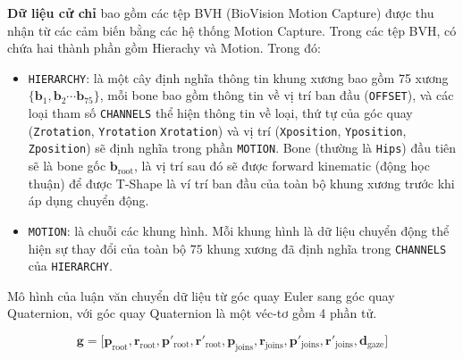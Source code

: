 \textbf{Dữ liệu cử chỉ} bao gồm các tệp BVH (BioVision Motion Capture) được thu nhận từ các cảm biến bằng các hệ thống Motion Capture. Trong các tệp BVH, có chứa hai thành phần gồm Hierachy và Motion. Trong đó:

\begin{itemize}
	\item \texttt{HIERARCHY}: là một cây định nghĩa thông tin khung xương bao gồm 75 xương $\{ \mathbf{b}_1, \mathbf{b}_2 \cdots \mathbf{b}_{75} \} $, mỗi bone bao gồm thông tin về vị trí ban đầu (\texttt{OFFSET}), và các loại tham số \texttt{CHANNELS} thể hiện thông tin về loại, thứ tự của góc quay (\texttt{Zrotation}, \texttt{Yrotation} \texttt{Xrotation}) và vị trí (\texttt{Xposition}, \texttt{Yposition}, \texttt{Zposition}) sẽ định nghĩa trong phần \texttt{MOTION}. Bone (thường là \texttt{Hips}) đầu tiên sẽ là bone gốc $\mathbf{b}_{\text{root}}$, là vị trí sau đó sẽ được forward kinematic (động học thuận) để được T-Shape là ví trí ban đầu của toàn bộ khung xương trước khi áp dụng chuyển động.
	
	\item \texttt{MOTION}: là chuỗi các khung hình. Mỗi khung hình là dữ liệu chuyển động thể hiện sự thay đổi của toàn bộ $75$ khung xương đã định nghĩa trong \texttt{CHANNELS} của \texttt{HIERARCHY}.
\end{itemize}


Mô hình của luận văn chuyển dữ liệu từ góc quay Euler sang góc quay Quaternion, với góc quay Quaternion là một véc-tơ gồm 4 phần tử.

\begin{equation} \label{eq:gesturevector}
	\mathbf{g} = \Big[ \mathbf{p}_{\text{root}},  \mathbf{r}_{\text{root}},
	\mathbf{ p }'_{\text{root}},  \mathbf{r}'_{\text{root}},
	\mathbf{p}_{\text{joins}},  \mathbf{r}_{\text{joins}},
	\mathbf{p}'_{\text{joins}},  \mathbf{r}'_{\text{joins}},
	\mathbf{d}_{\text{gaze}}
	\Big]
\end{equation}


